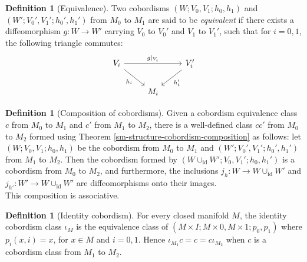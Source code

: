 \documentclass[reqno]{amsart}
\theoremstyle{definition}
\newtheorem{definition}[theorem]{Definition}
\theoremstyle{remark}
\newcommand{\id}{{\mathrm{id}}}
\begin{document}
    \begin{definition}[Equivalence]
        Two cobordisms
        $\left( W;V_0,V_1;h_0,h_1 \right) $ and
        $\left( W';V_0',V_1';h_0',h_1' \right) $ from
        $M_0$ to $M_1$ are said to be \textit{equivalent} if
        there exists a diffeomorphism
        $g \colon W \to W'$ carrying $V_0$ to $V_0'$ 
        and $V_1$ to $V_1'$, such that for
        $i = 0,1$, the following triangle commutes:
        \begin{equation*}
        \begin{tikzcd}
            V_i \ar[rr, "g|_{V_i}"]\ar[dr, "h_i"']
            && V_i' \ar[dl, "h_i'"]\\
                                    & M_i &
        \end{tikzcd}
        \end{equation*}
    \end{definition}


    \begin{definition}[Composition of cobordisms]
        Given a cobordism equivalence class $c$ from
        $M_0$ to $M_1$ and $c'$ from
        $M_1$ to $M_2$, there
        is a well-defined class
        $ c c'$ from $M_0$ to $M_2$ formed
        using Theorem \ref{sm-structure-cobordism-composition} as
        follows:
        let 
        $\left( W; V_0, V_1; h_0, h_1 \right) $ be
        the cobordism from $M_0$ to $M_1$ and
        $\left( W'; V_0', V_1'; h_0',h_1' \right) $ 
        from $M_1$ to $M_2$.
        Then the cobordism formed by
        $\left( W \cup_{\id} W';
        V_0, V_1'; h_0, h_1'\right) $ 
        is a cobordism from $M_0$ to $M_2$, and
        furthermore, the inclusions
        $j_h \colon W \to W \cup_{\id} W'$ and
        $j_{h'} \colon W' \to 
        W \cup_{\id}W'$ are diffeomorphisms onto
        their images.\\

        This composition is
        associative.
    \end{definition}

    \begin{definition}[Identity cobordism]
        For every closed manifold $M$, the
        identity cobordism class
        $\iota_M $ is the equivalence class of
        $\left( M \times I; M \times 0,
        M \times 1 ; p_0 , p_1\right) $ where
        $p_i (x,i) = x$, for $x \in M$ and $i = 0,1$.
        Hence
        $\iota_{M_1} c = c  = c \iota_{M_2}$ when
        $c$ is a cobordism class from $M_1$ to $M_2$.
    \end{definition}
\end{document}
